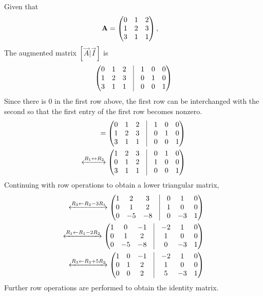 
    Given that
    \begin{align}
    \mathbf{A}& =\begin{pmatrix} 0 & 1 & 2\\1 & 2 & 3\\3 & 1 & 1\end{pmatrix},
    \end{align}
     The augmented matrix $[\vec{A} | \vec{I}]$ is 
    \begin{align}
    \myvec{0 & 1 & 2 & \vrule & 1 & 0 & 0\\1 & 2 & 3 & \vrule & 0 & 1 & 0\\3 & 1 & 1 & \vrule & 0 & 0 & 1}
    \end{align}
    Since there is 0 in the first row above, the first row can be interchanged with the second so that the first entry of the first row becomes nonzero.
    \begin{align}
    [\vec{A} | \vec{I}] = \myvec{0 & 1 & 2 & \vrule & 1 & 0 & 0\\1 & 2 & 3 & \vrule & 0 & 1 & 0\\3 & 1 & 1 & \vrule & 0 & 0 & 1}
    \\
    \xleftrightarrow{R_1\leftrightarrow R_2}   
    \myvec{1 & 2 & 3 & \vrule & 0 & 1 & 0\\0 & 1 & 2 & \vrule & 1 & 0 & 0\\3 & 1 & 1 & \vrule & 0 & 0 & 1}
    \end{align}
    Continuing with row operations to obtain a lower triangular matrix, 
    \begin{align}
    \xleftrightarrow{R_3\leftarrow R_3-3R_1}   
    \myvec{1 & 2 & 3 & \vrule & 0 & 1 & 0\\0 & 1 & 2 & \vrule & 1 & 0 & 0\\0 & -5 & -8 & \vrule & 0 & -3 & 1}
    \\
    \xleftrightarrow{R_1\leftarrow R_1-2R_2}  
    \myvec{1 & 0 & -1 & \vrule & -2 & 1 & 0\\0 & 1 & 2 & \vrule & 1 & 0 & 0\\0 & -5 & -8 & \vrule & 0 & -3 & 1}
    \\
    \xleftrightarrow{R_3\leftarrow R_3+5R_2}  
    \myvec{1 & 0 & -1 & \vrule & -2 & 1 & 0\\0 & 1 & 2 & \vrule & 1 & 0 & 0\\0 & 0 & 2 & \vrule & 5 & -3 & 1}
    \end{align}
   Further row operations are performed to obtain the identity matrix.  
